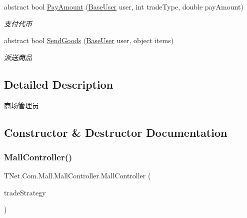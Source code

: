 \begin{DoxyCompactItemize}
abstract bool \mbox{\hyperlink{class_t_net_1_1_com_1_1_mall_1_1_mall_controller_a7e2ab42797c7217aa8f593b8a25e070b}{Pay\+Amount}} (\mbox{\hyperlink{class_t_net_1_1_context___1_1_base_user}{Base\+User}} user, int trade\+Type, double pay\+Amount)
\begin{DoxyCompactList}\small\item\em 支付代币 \end{DoxyCompactList}\item 
abstract bool \mbox{\hyperlink{class_t_net_1_1_com_1_1_mall_1_1_mall_controller_a1954dac300006b686ac6a936bfd141b2}{Send\+Goods}} (\mbox{\hyperlink{class_t_net_1_1_context___1_1_base_user}{Base\+User}} user, object items)
\begin{DoxyCompactList}\small\item\em 派送商品 \end{DoxyCompactList}\end{DoxyCompactItemize}


\subsection{Detailed Description}
商场管理员 



\subsection{Constructor \& Destructor Documentation}
\mbox{\label{class_t_net_1_1_com_1_1_mall_1_1_mall_controller_ac450c5bdf31251e38f119be0cdf24358}} 
\subsubsection{\texorpdfstring{Mall\+Controller()}{MallController()}}
{\footnotesize\ttfamily T\+Net.\+Com.\+Mall.\+Mall\+Controller.\+Mall\+Controller (\begin{DoxyParamCaption}\item[{\mbox{\hyperlink{interface_t_net_1_1_com_1_1_mall_1_1_i_trade}{I\+Trade}}}]{trade\+Strategy }\end{DoxyParamCaption})\hspace{0.3cm}{\ttfamily [protected]}}



